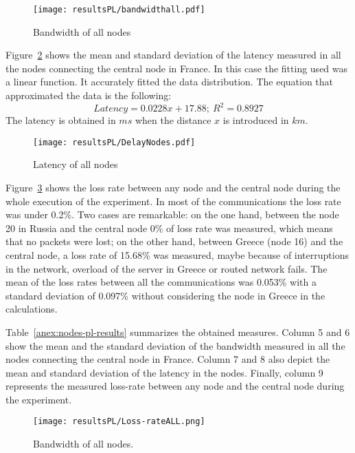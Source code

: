 \begin{center}
\begin{figure}[h]
  \centering
  \texttt{[image: resultsPL/bandwidthall.pdf]}\\
  \caption{Bandwidth of all nodes} \label{fig:bandwidth-plot}
\end{figure}
\end{center}

Figure~\ref{fig:delay-plot} shows the mean and standard
deviation of the latency measured in all the nodes connecting the central node
in France. In this case the fitting used was a linear function. It accurately fitted the data distribution. The equation that approximated the data is the following:
\begin{equation}\label{eq:latency_fitting}
Latency=0.0228x+17.88;~R^2=0.8927
\end{equation}
The latency is obtained in $ms$ when the distance $x$ is introduced in $km$.


\begin{center}
\begin{figure}[h]
  \centering
  \texttt{[image: resultsPL/DelayNodes.pdf]}\\
  \caption{Latency of all nodes} \label{fig:delay-plot}
\end{figure}
\end{center}

Figure~\ref{fig:loss-rate-plot} shows the loss rate between any node and the central node during the whole execution of the experiment. In most of the communications the loss rate was under 0.2\%. Two cases are remarkable: on the one hand, between the node 20 in Russia and the central node 0\% of loss rate was measured, which means that no packets were lost; on the other hand, between Greece (node 16) and the central node, a loss rate of 15.68\% was measured, maybe because of interruptions in the network, overload of the server in Greece or routed network fails. The mean of the loss rates between all the communications was 0.053\% with a standard deviation of 0.097\% without considering the node in Greece in the calculations.

Table~\ref{anex:nodes-pl-results} summarizes the obtained measures. Column 5 and 6 show the mean and
the standard deviation of the bandwidth measured in all the nodes connecting the
central node in France. Column 7 and 8 also depict the mean and standard
deviation of the latency in the nodes. Finally, column 9 represents the measured
loss-rate between any node and the central node during the experiment.




\begin{center}
\begin{figure}[h]
  \centering
  \texttt{[image: resultsPL/Loss-rateALL.png]}\\
  \caption{Bandwidth of all nodes.} \label{fig:loss-rate-plot}
\end{figure}
\end{center}
